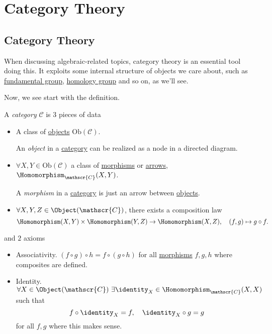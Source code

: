 \chapter{Category Theory}
\section{Category Theory}
When discussing algebraic-related topics, category theory is an essential tool doing this. It exploits some
internal structure of objects we care about, such as \hyperref[def:fundamental-group]{fundamental group},
\hyperref[def:homology-group]{homology group} and so on, as we'll see.

Now, we see start with the definition.
\begin{definition}[Category]\label{def:category}
	A \emph{category} \(\mathscr{C} \) is \(3\) pieces of data
	\begin{itemize}
		\item A class of \hyperref[def:object]{objects} \(\mathrm{Ob}(\mathscr{C})\).
		      \begin{definition}[Object]\label{def:object}
			      An \emph{object} in a \hyperref[def:category]{category} can be realized as a node in a directed diagram.
		      \end{definition}
		\item \(\forall X, Y\in\mathrm{Ob} (\mathscr{C})\) a class of \hyperref[def:morphism]{morphisms} or \underline{arrows},
		      \(\Homomorphism_{\mathscr{C}}(X, Y)\).
		      \begin{definition}[Morphism]\label{def:morphism}
			      A \emph{morphism} in a \hyperref[def:category]{category} is just an arrow between \hyperref[def:object]{objects}.
		      \end{definition}
		\item \(\forall X, Y, Z\in \Object (\mathscr{C})\), there exists a composition law
		      \[
			      \Homomorphism (X, Y)\times \Homomorphism (Y, Z)\to \Homomorphism (X, Z),\quad (f, g)\mapsto g\circ f.
		      \]
	\end{itemize}
	and \(2\) axioms
	\begin{itemize}
		\item Associativity. \((f\circ g)\circ h = f\circ (g\circ h)\) for all \hyperref[def:morphism]{morphisms} \(f, g, h\)
		      where composites are defined.
		\item Identity. \(\forall X\in\Object (\mathscr{C})\ \exists \identity_{X}\in\Homomorphism _{\mathscr{C}} (X, X)\) such that
		      \[
			      f\circ \identity_{X} = f,\quad \identity_{X} \circ g = g
		      \]
		      for all \(f, g\) where this makes sense.
	\end{itemize}
\end{definition}

